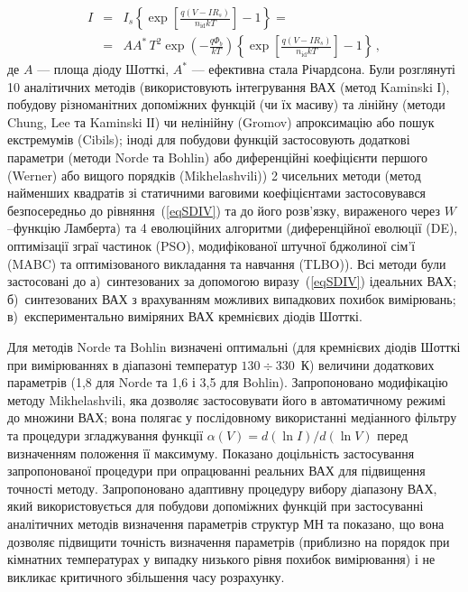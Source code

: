\begin{eqnarray}
\label{eqSDIV}
\nonumber I&=&I_s\left\{\exp\left[\frac{q(V-IR_s)}{n_\mathrm{id}kT}\right]-1\right\}=\\
&=&AA^*\,T^2\exp\left(-\frac{q\Phi_b}{kT}\right)\left\{\exp\left[\frac{q(V-IR_s)}{n_\mathrm{id}kT}\right]-1\right\}\,,
\end{eqnarray}
де
$A$ --- площа діоду Шотткі,
$A^*$ --- ефективна стала Річардсона.
Були розглянуті 10 аналітичних методів (використовують інтегрування ВАХ (метод Kaminski І), побудову різноманітних допоміжних функцій (чи їх масиву) та лінійну (методи Chung, Lee та Kaminski ІІ) чи нелінійну (Gromov) апроксимацію або пошук екстремумів (Cibils);
іноді для побудови функцій застосовують додаткові параметри (методи Norde та Bohlin) або диференційні коефіцієнти першого (Werner) або вищого порядків (Mikhelashvili))
2 чисельних методи (метод найменших квадратів зі статичними ваговими коефіцієнтами застосовувався безпосередньо до рівняння~(\ref{eqSDIV}) та до його розв'язку, вираженого через $W$--функцію Ламберта) та
4 еволюційних алгоритми (диференційної еволюції (DE),
оптимізації зграї частинок (PSO),
модифікованої штучної бджолиної сім'ї (MABC) та
оптимізованого викладання та навчання (TLBO)).
Всі методи були застосовані до
а)~синтезованих за допомогою виразу~(\ref{eqSDIV}) ідеальних ВАХ;
б)~синтезованих ВАХ з врахуванням можливих випадкових похибок вимірювань;
в)~експериментально виміряних ВАХ кремнієвих діодів Шотткі.

Для методів Norde та Bohlin визначені  оптимальні (для кремнієвих діодів Шотткі при вимірюваннях в діапазоні температур $130\div330$~К) величини додаткових параметрів (1,8 для Norde та 1,6 і 3,5 для Bohlin).
Запропоновано модифікацію методу Mikhelashvili, яка дозволяє застосовувати його в автоматичному режимі до множини ВАХ;
вона полягає у послідовному використанні медіанного фільтру та процедури згладжування функції $\alpha(V)=d(\ln I)/d(\ln V)$ перед визначенням положення її максимуму.
Показано доцільність застосування запропонованої процедури при опрацюванні реальних ВАХ для підвищення точності методу.
Запропоновано адаптивну процедуру вибору діапазону ВАХ, який використовується для побудови допоміжних функцій при застосуванні аналітичних методів визначення параметрів структур МН та показано, що вона дозволяє підвищити точність визначення параметрів (приблизно на порядок при кімнатних температурах у випадку низького рівня похибок вимірювання) і не викликає критичного збільшення часу розрахунку.

